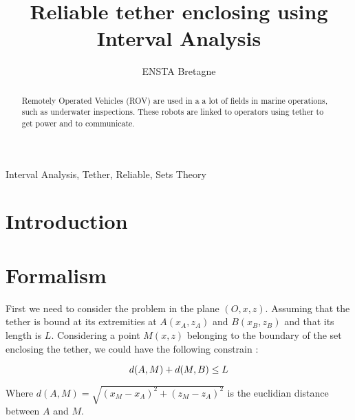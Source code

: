 \documentclass[conference]{IEEEtran}
\begin{document}
    \title{Reliable tether enclosing using Interval Analysis}

    \author{ ENSTA Bretagne}

    \maketitle

    \begin{abstract}
        Remotely Operated Vehicles (ROV) are used in a a lot of fields in marine operations, such as
        underwater inspections. These robots are linked to operators using tether to get power and
        to communicate.
    \end{abstract}

    \begin{IEEEkeywords}
        Interval Analysis, Tether, Reliable, Sets Theory
    \end{IEEEkeywords}

    \section{Introduction}

    \section{Formalism}
        First we need to consider the problem in the plane $(O, x, z)$. Assuming that the tether is 
        bound at its extremities at $A (x_A, z_A)$ and $B (x_B, z_B)$ and that its length is $L$. 
        Considering a point $M (x, z)$ belonging to the boundary of the set enclosing the tether,
        we could have the following constrain :

        \begin{equation}
            d(A, M) + d(M, B) \leq L \\
        \end{equation}

        Where $d(A, M) = \sqrt{(x_M - x_A)^2 + (z_M - z_A)^2}$ is the euclidian distance between
        $A$ and $M$.
\end{document}
